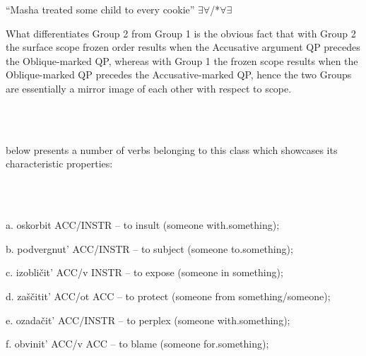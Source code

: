 \documentclass[output=paper,modfonts, nonflat]{langsci/langscibook}
\begin{document}
\begin{styleinnerExample}
    “Masha treated some child to every cookie” ${\exists}{\forall}$/*${\forall}{\exists}$
\end{styleinnerExample}

What differentiates Group 2 from Group 1 is the obvious fact that with Group 2 the surface scope frozen order results when the Accusative argument QP precedes the Oblique-marked QP, whereas with Group 1 the frozen scope results when the Oblique-marked QP precedes the Accusative-marked QP, hence the two Groups are essentially a mirror image of each other with respect to scope.

\ea%
    \label{ex:key:16}
    \gll\\
        \\
    \glt
    \z

         below presents a number of verbs belonging to this class which showcases its characteristic properties:

\begin{styleinnerExample}
\ea%
    \label{ex:key:16}
    \gll\\
        \\
    \glt
    \z

          a.  oskorbit ACC/INSTR – to insult (someone with.something);
\end{styleinnerExample}

\begin{styleinnerExample}
  b.  podvergnut’ ACC/INSTR – to subject (someone to.something);
\end{styleinnerExample}

\begin{styleinnerExample}
  c.  izobličit’ ACC/v INSTR – to expose (someone in something);
\end{styleinnerExample}

\begin{styleinnerExample}
  d.  zaščitit’ ACC/ot ACC – to protect (someone from something/someone);
\end{styleinnerExample}

\begin{styleinnerExample}
  e.  ozadačit’ ACC/INSTR – to perplex (someone with.something);
\end{styleinnerExample}

\begin{styleinnerExample}
  f.  obvinit’ ACC/v ACC – to blame (someone for.something);
\end{styleinnerExample}
\end{document}
